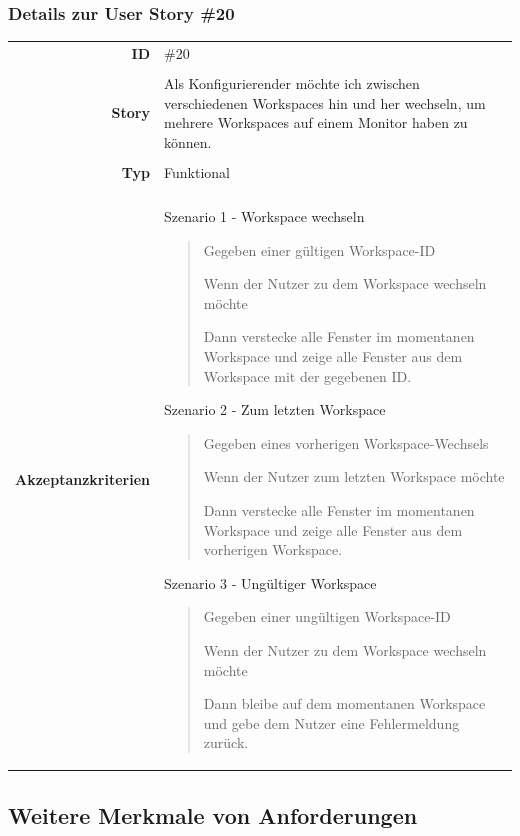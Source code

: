 \documentclass{article}
\begin{document}
\subsubsection{Details zur User Story \#20}

\begin{tabularx}{\textwidth}{r X}
	\textbf{ID}                 & \#20                                                                                                                                             \\
	\\
	\textbf{Story}              & Als Konfigurierender möchte ich zwischen verschiedenen Workspaces hin und her wechseln, um mehrere Workspaces auf einem Monitor haben zu können. \\
	\\
	\textbf{Typ}                & Funktional                                                                                                                                       \\
	\\
	\textbf{Akzeptanzkriterien} & Szenario 1 - Workspace wechseln
	\begin{quote}
		Gegeben einer gültigen Workspace-ID

		Wenn der Nutzer zu dem Workspace wechseln möchte

		Dann verstecke alle Fenster im momentanen Workspace und zeige alle Fenster aus dem Workspace mit der gegebenen ID.
	\end{quote}
	Szenario 2 - Zum letzten Workspace
	\begin{quote}
		Gegeben eines vorherigen Workspace-Wechsels

		Wenn der Nutzer zum letzten Workspace möchte

		Dann verstecke alle Fenster im momentanen Workspace und zeige alle Fenster aus dem vorherigen Workspace.
	\end{quote}
	Szenario 3 - Ungültiger Workspace
	\begin{quote}
		Gegeben einer ungültigen Workspace-ID

		Wenn der Nutzer zu dem Workspace wechseln möchte

		Dann bleibe auf dem momentanen Workspace und gebe dem Nutzer eine Fehlermeldung zurück.
	\end{quote}
\end{tabularx}

\newpage

\subsection{Weitere Merkmale von Anforderungen}
\end{document}

